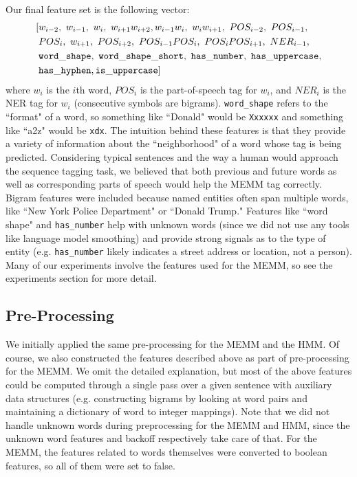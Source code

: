 \documentclass[12pt]{article}
\begin{document}
Our final feature set is the following vector:
\begin{equation*}
\begin{split}
[&w_{i - 2},\ w_{i - 1},\ w_i,\ w_{i + 1}w_{i + 2},
w_{i - 1}w_i,\ w_iw_{i + 1},\ POS_{i - 2},\ POS_{i - 1},\\
&POS_i,\ w_{i + 1},\ POS_{i + 2}, \ POS_{i - 1}POS_i,\ POS_iPOS_{i + 1},\ NER_{i - 1},\\
&{\tt word\_shape,\ word\_shape\_short,\ has\_number,\ has\_uppercase,}\\
&{\tt has\_hyphen, is\_uppercase}
]
\end{split}
\end{equation*}
where $w_i$ is the $i$th word, $POS_i$ is the part-of-speech tag for $w_i$, and $NER_i$ is the NER tag for $w_i$ (consecutive symbols are bigrams). {\tt word\_shape} refers to the ``format" of a word, so something like ``Donald" would be {\tt Xxxxxx} and something like ``a2z" would be {\tt xdx}.
The intuition behind these features is that they provide a variety of information about the ``neighborhood" of a word whose tag is being predicted. Considering typical sentences and the way a human would approach the sequence tagging task, we believed that both previous and future words as well as corresponding parts of speech would help the MEMM tag correctly. Bigram features were included because named entities often span multiple words, like ``New York Police Department" or ``Donald Trump." Features like ``word shape" and {\tt has\_number} help with unknown words (since we did not use any tools like language model smoothing) and provide strong signals as to the type of entity (e.g. {\tt has\_number} likely indicates a street address or location, not a person). Many of our experiments involve the features used for the MEMM, so see the experiments section for more detail.
\subsection{Pre-Processing}
We initially applied the same pre-processing for the MEMM and the HMM. Of course, we also constructed the features described above as part of pre-processing for the MEMM. We omit the detailed explanation, but most of the above features could be computed through a single pass over a given sentence with auxiliary data structures (e.g. constructing bigrams by looking at word pairs and maintaining a dictionary of word to integer mappings). Note that we did not handle unknown words during preprocessing for the MEMM and HMM, since the unknown word features and backoff respectively take care of that. For the MEMM, the features related to words themselves were converted to boolean features, so all of them were set to false.
\end{document}
